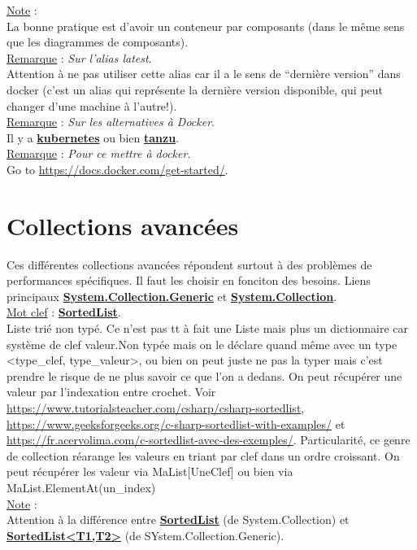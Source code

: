 \documentclass[a4paper,12pt,twoside]{article}
\newcommand{\urlcolor}{magenta}  %
\newcommand{\keycolor}{purple} %
\newcommand{\incode}[1]{{\footnotesize\ttfamily #1}} %
\newcommand{\rem}[2]{\noindent\underline{Remarque} : \textit{#1}.\\ \indent #2}
\newcommand{\note}[1]{\noindent\underline{Note} : \\ \indent #1}
\newcommand{\keyref}[2]{\hypersetup{urlcolor=\keycolor} \href{#1}{\textbf{#2}}\hypersetup{urlcolor=\urlcolor}}
\newcommand{\keyword}[3]{\noindent\underline{Mot clef} : \keyref{#1}{#2}. \\ \indent #3}
\begin{document}
\note{La bonne pratique est d'avoir un conteneur par composants (dans le même sens que les diagrammes de composants).}\\

\rem{Sur l'alias latest}{Attention à ne pas utiliser cette alias car il a le sens de ``dernière version'' dans docker (c'est un alias qui représente la dernière version disponible, qui peut changer d'une machine à l'autre!).}\\

\rem{Sur les alternatives à Docker}{Il y a \keyref{https://kubernetes.io/fr/}{kubernetes} ou bien \keyref{https://tanzu.vmware.com/tanzu}{tanzu}.}\\

\rem{Pour ce mettre à docker}{Go to \url{https://docs.docker.com/get-started/}.}\\

\section{Collections avancées}

Ces différentes collections avancées répondent surtout à des problèmes de performances spécifiques. Il faut les choisir en fonciton des besoins. Liens principaux \keyref{https://docs.microsoft.com/fr-fr/dotnet/api/system.collections.generic?view=net-6.0}{System.Collection.Generic} et \keyref{https://docs.microsoft.com/fr-fr/dotnet/api/system.collections?view=net-6.0}{System.Collection}.\\

\keyword{https://docs.microsoft.com/fr-fr/dotnet/api/system.collections.sortedlist?view=net-6.0}{SortedList}{Liste trié non typé. Ce n'est pas tt à fait une Liste mais plus un dictionnaire car système de clef valeur.Non typée mais on le déclare quand même avec un type <type\_clef, type\_valeur>, ou bien on peut juste ne pas la typer mais c'est prendre le risque de ne plus savoir ce que l'on a dedans. On peut récupérer une valeur par l'indexation entre crochet. Voir \url{https://www.tutorialsteacher.com/csharp/csharp-sortedlist}, \url{https://www.geeksforgeeks.org/c-sharp-sortedlist-with-examples/} et \url{https://fr.acervolima.com/c-sortedlist-avec-des-exemples/}. Particularité, ce genre de collection réarange les valeurs en triant par clef dans un ordre croissant. On peut récupérer les valeur via \incode{MaList[UneClef]} ou bien via \incode{MaList.ElementAt(un\_index)}}\\

\note{Attention à la différence entre \keyref{https://docs.microsoft.com/fr-fr/dotnet/api/system.collections.sortedlist?view=net-6.0}{SortedList} (de System.Collection) et \keyref{https://docs.microsoft.com/fr-fr/dotnet/api/system.collections.generic.sortedlist-2?view=net-6.0}{SortedList<T1,T2>} (de SYstem.Collection.Generic).}\\
\end{document}
